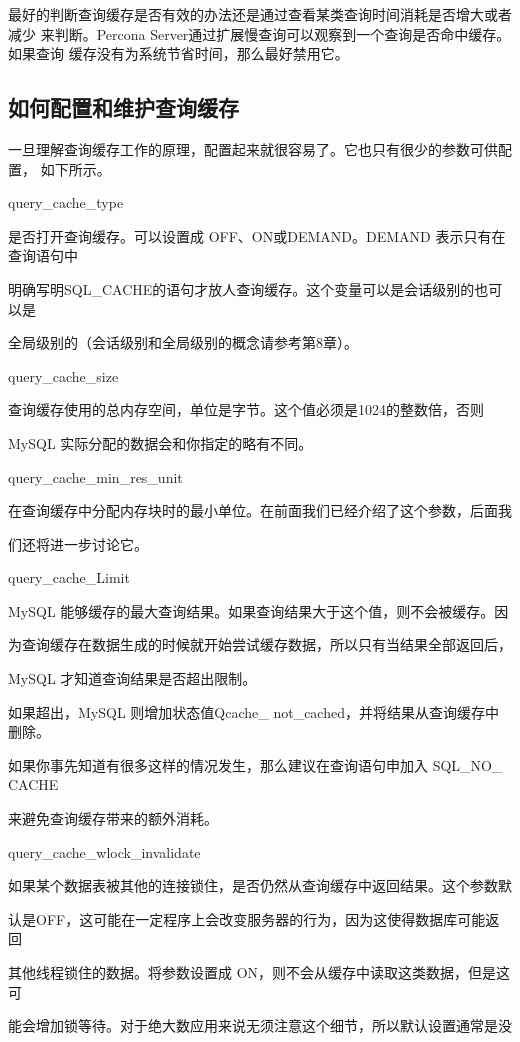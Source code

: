 最好的判断查询缓存是否有效的办法还是通过查看某类查询时间消耗是否增大或者减少
来判断。Percona Server通过扩展慢查询可以观察到一个查询是否命中缓存。如果查询
缓存没有为系统节省时间，那么最好禁用它。

\subsection{如何配置和维护查询缓存}
一旦理解查询缓存工作的原理，配置起来就很容易了。它也只有很少的参数可供配置，
如下所示。

query\_cache\_type

是否打开查询缓存。可以设置成 OFF、ON或DEMAND。DEMAND 表示只有在查询语句中

明确写明SQL\_CACHE的语句才放人查询缓存。这个变量可以是会话级别的也可以是

全局级别的（会话级别和全局级别的概念请参考第8章）。

query\_cache\_size

查询缓存使用的总内存空间，单位是字节。这个值必须是1024的整数倍，否则

MySQL 实际分配的数据会和你指定的略有不同。

query\_cache\_min\_res\_unit

在查询缓存中分配内存块时的最小单位。在前面我们已经介绍了这个参数，后面我

们还将进一步讨论它。

query\_cache\_Limit

MySQL 能够缓存的最大查询结果。如果查询结果大于这个值，则不会被缓存。因

为查询缓存在数据生成的时候就开始尝试缓存数据，所以只有当结果全部返回后，

MySQL 才知道查询结果是否超出限制。

如果超出，MySQL 则增加状态值Qcache\_ not\_cached，并将结果从查询缓存中删除。

如果你事先知道有很多这样的情况发生，那么建议在查询语句申加入 SQL\_NO\_ CACHE

来避免查询缓存带来的额外消耗。

query\_cache\_wlock\_invalidate

如果某个数据表被其他的连接锁住，是否仍然从查询缓存中返回结果。这个参数默

认是OFF，这可能在一定程序上会改变服务器的行为，因为这使得数据库可能返回

其他线程锁住的数据。将参数设置成 ON，则不会从缓存中读取这类数据，但是这可

能会增加锁等待。对于绝大数应用来说无须注意这个细节，所以默认设置通常是没

